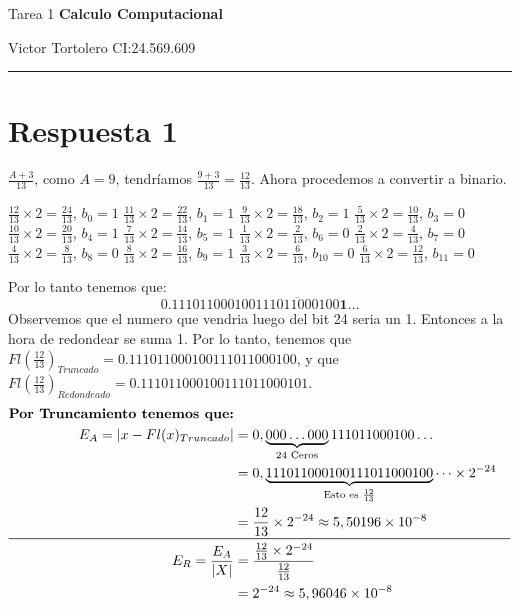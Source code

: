\documentclass{article}
\begin{document}
\flushleft
\setlength{\parindent}{20pt}

\centerline{\huge Tarea 1 \textbf{Calculo Computacional}}
\centerline{Victor Tortolero CI:24.569.609}  %
\hrule
	
\section*{Respuesta 1}
$\frac{A + 3}{13}$, como $A = 9$, tendríamos $\frac{9 + 3}{13} = \frac{12}{13}$.
Ahora procedemos a convertir a binario. \newline
\begin{multicols}{2}
	$\frac{12}{13} \times 2 = \frac{24}{13}$, $b_{0} = 1$ \newline
	$\frac{11}{13} \times 2 = \frac{22}{13}$, $b_{1} = 1$ \newline
	$\frac{9}{13} \times 2 = \frac{18}{13}$, $b_{2} = 1$ \newline
	$\frac{5}{13} \times 2 = \frac{10}{13}$, $b_{3} = 0$ \newline
	$\frac{10}{13} \times 2 = \frac{20}{13}$, $b_{4} = 1$ \newline
	$\frac{7}{13} \times 2 = \frac{14}{13}$, $b_{5} = 1$ \newline
	$\frac{1}{13} \times 2 = \frac{2}{13}$, $b_{6} = 0$ \newline
	$\frac{2}{13} \times 2 = \frac{4}{13}$, $b_{7} = 0$ \newline
	$\frac{4}{13} \times 2 = \frac{8}{13}$, $b_{8} = 0$ \newline
	$\frac{8}{13} \times 2 = \frac{16}{13}$, $b_{9} = 1$ \newline
	$\frac{3}{13} \times 2 = \frac{6}{13}$, $b_{10} = 0$ \newline
	$\frac{6}{13} \times 2 = \frac{12}{13}$, $b_{11} = 0$ \newline
\end{multicols}

Por lo tanto tenemos que:
\begin{equation*}
	0.111011000100\overline{111011000100}\textbf{1}\dots
\end{equation*}
Observemos que el numero que vendria luego del bit 24 seria un 1. Entonces a la hora de redondear se suma 1.
Por lo tanto, tenemos que $Fl(\frac{12}{13})_{Truncado} = 0.111011000100111011000100$, 
y que $Fl(\frac{12}{13})_{Redondeado} = 0.111011000100111011000101$.
\begin{align*} %
	\text{\textbf{Por Truncamiento tenemos que:}} \\
	E_{A} = |x - Fl(x)_{Truncado}| & = 0, \underbrace{000\dots000}_\text{24 Ceros}111011000100\dots \\
	& = 0,\underbrace{111011000100111011000100}_\text{Esto es $\frac{12}{13}$}\dots \times 2^{-24} \\
	& = \frac{12}{13} \times 2^{-24} \approx 5,50196 \times 10^{-8} \\ \midrule
	E_{R} = \frac{E_{A}}{|X|} & = \frac{\frac{12}{13} \times 2^{-24}}{\frac{12}{13}} \\
	& = 2^{-24} \approx 5,96046 \times 10^{-8}
\end{align*}
\end{document}
